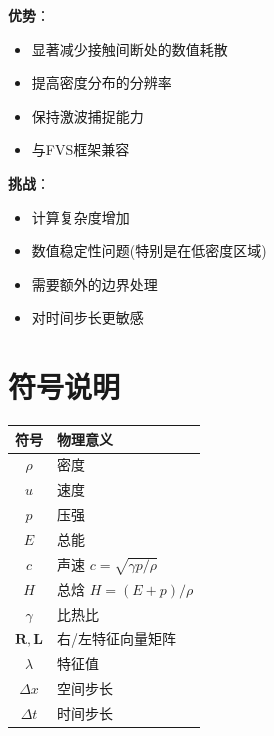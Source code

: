 \documentclass[UTF8]{ctexart}
\begin{document}
\textbf{优势}：
\begin{itemize}
    \item 显著减少接触间断处的数值耗散
    \item 提高密度分布的分辨率
    \item 保持激波捕捉能力
    \item 与FVS框架兼容
\end{itemize}

\textbf{挑战}：
\begin{itemize}
    \item 计算复杂度增加
    \item 数值稳定性问题(特别是在低密度区域)
    \item 需要额外的边界处理
    \item 对时间步长更敏感
\end{itemize}



\section*{符号说明}
\begin{table}[h]
\centering
\begin{tabular}{c|l}
\hline
符号 & 物理意义 \\
\hline
$\rho$ & 密度 \\
$u$ & 速度 \\
$p$ & 压强 \\
$E$ & 总能 \\
$c$ & 声速 $c = \sqrt{\gamma p / \rho}$ \\
$H$ & 总焓 $H = (E + p)/\rho$ \\
$\gamma$ & 比热比 \\
$\mathbf{R},\mathbf{L}$ & 右/左特征向量矩阵 \\
$\lambda$ & 特征值 \\
$\Delta x$ & 空间步长 \\
$\Delta t$ & 时间步长 \\
\hline
\end{tabular}
\end{table}


\newpage
\end{document}
